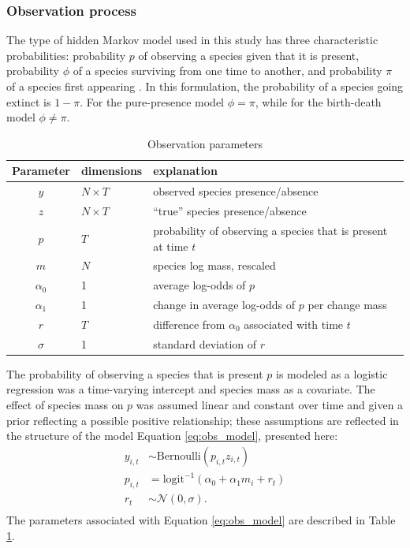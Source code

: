 \documentclass[12pt,letterpaper]{article}
\begin{document}
\subsubsection*{Observation process}
The type of hidden Markov model used in this study has three characteristic probabilities: probability \(p\) of observing a species given that it is present, probability \(\phi\) of a species surviving from one time to another, and probability \(\pi\) of a species first appearing \citep{Royle2008}. In this formulation, the probability of a species going extinct is \(1 - \pi\). For the pure-presence model \(\phi = \pi\), while for the birth-death model \(\phi \neq \pi\).

\begin{table}
  \centering
  \caption{Observation parameters}
  \begin{tabular}{c l l}
    Parameter & dimensions & explanation \\
    \hline
    \(y\) & \(N \times T\) & observed species presence/absence \\
    \(z\) & \(N \times T\) & ``true'' species presence/absence \\
    \(p\) & \(T\) & probability of observing a species that is present at time \(t\) \\
    \(m\) & \(N\) & species log mass, rescaled \\
    \(\alpha_{0}\) & 1 & average log-odds of \(p\) \\ %
    \(\alpha_{1}\) & 1 & change in average log-odds of \(p\) per change mass \\
    \(r\) & \(T\) & difference from \(\alpha_{0}\) associated with time \(t\) \\
    \(\sigma\) & 1 & standard deviation of \(r\) \\
  \end{tabular}
  \label{tab:obs_param}
\end{table}

The probability of observing a species that is present \(p\) is modeled as a logistic regression was a time-varying intercept and species mass as a covariate. The effect of species mass on \(p\) was assumed linear and constant over time and given a prior reflecting a possible positive relationship; these assumptions are reflected in the structure of the model Equation \ref{eq:obs_model}, presented here:
\begin{equation}
  \begin{aligned}
    y_{i, t} &\sim \text{Bernoulli}(p_{i, t} z_{i, t}) \\
    p_{i, t} &= \text{logit}^{-1}(\alpha_{0} + \alpha_{1} m_{i} + r_{t}) \\ 
    r_{t} &\sim \mathcal{N}(0, \sigma). \\
  \end{aligned}
  \label{eq:obs_model}
\end{equation}
The parameters associated with Equation \ref{eq:obs_model} are described in Table \ref{tab:obs_param}.
\end{document}
